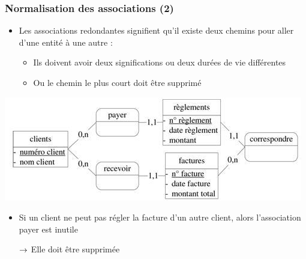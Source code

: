 \begin{frame}
  \frametitle{Normalisation des associations (2)}
  \begin{itemize}
    \item Les associations redondantes signifient qu'il existe deux chemins pour aller d'une entité à une autre :
      \begin{itemize}
        \item Ils doivent avoir deux significations ou deux durées de vie différentes
        \item Ou le chemin le plus court doit être supprimé
      \end{itemize}
  \end{itemize}
  \begin{center}
    \includegraphics[width=0.9\linewidth]{association_redondante.jpg}
  \end{center}
  \begin{itemize}
    \item Si un client ne peut pas régler la facture d'un autre client, alors l'association payer est inutile
    \item[$\rightarrow$] Elle doit être supprimée
  \end{itemize}
\end{frame}

